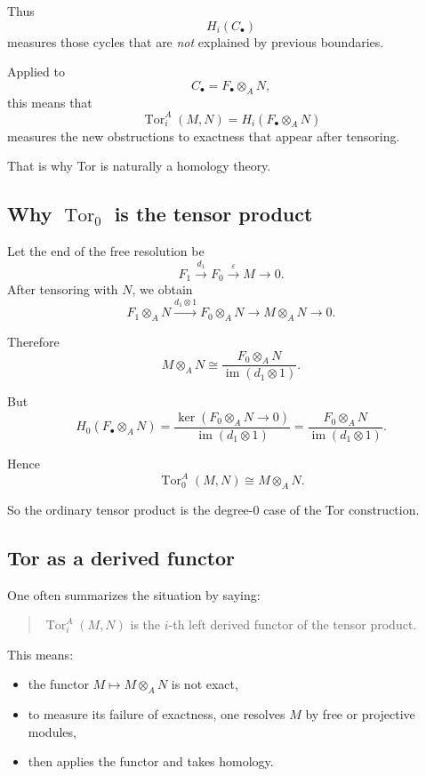 \documentclass[12pt,a4paper]{article}
\theoremstyle{notespace}
\begin{document}
Thus
\[
H_i(C_\bullet)
\]
measures those cycles that are \emph{not} explained by previous boundaries.

Applied to
\[
C_\bullet=F_\bullet\otimes_A N,
\]
this means that
\[
\operatorname{Tor}_i^A(M,N)
=
H_i(F_\bullet\otimes_A N)
\]
measures the new obstructions to exactness that appear after tensoring.

That is why Tor is naturally a homology theory.

\subsection{Why \(\operatorname{Tor}_0\) is the tensor product}

Let the end of the free resolution be
\[
F_1 \xrightarrow{d_1} F_0 \xrightarrow{\varepsilon} M \to 0.
\]
After tensoring with \(N\), we obtain
\[
F_1\otimes_A N \xrightarrow{d_1\otimes 1} F_0\otimes_A N \to M\otimes_A N \to 0.
\]

Therefore
\[
M\otimes_A N
\cong
\frac{F_0\otimes_A N}{\operatorname{im}(d_1\otimes 1)}.
\]

But
\[
H_0(F_\bullet\otimes_A N)
=
\frac{\ker(F_0\otimes_A N\to 0)}{\operatorname{im}(d_1\otimes 1)}
=
\frac{F_0\otimes_A N}{\operatorname{im}(d_1\otimes 1)}.
\]

Hence
\[
\operatorname{Tor}_0^A(M,N)\cong M\otimes_A N.
\]

So the ordinary tensor product is the degree-\(0\) case of the Tor construction.

\subsection{Tor as a derived functor}

One often summarizes the situation by saying:

\begin{quote}
	\(\operatorname{Tor}_i^A(M,N)\) is the \(i\)-th left derived functor of the tensor product.
\end{quote}

This means:

\begin{itemize}
	\item the functor \(M\mapsto M\otimes_A N\) is not exact,
	\item to measure its failure of exactness, one resolves \(M\) by free or projective modules,
	\item then applies the functor and takes homology.
\end{itemize}
\end{document}
